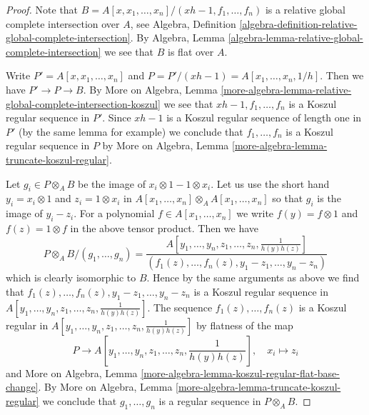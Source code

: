 \begin{proof}

Note that
$B = A[x, x_1, \ldots, x_n]/(xh - 1, f_1, \ldots, f_n)$
is a relative global complete intersection over $A$, see
Algebra, Definition
\ref{algebra-definition-relative-global-complete-intersection}.
By Algebra, Lemma \ref{algebra-lemma-relative-global-complete-intersection}
we see that $B$ is flat over $A$.

\medskip\noindent
Write $P' = A[x, x_1, \ldots, x_n]$ and
$P = P'/(xh - 1) = A[x_1, \ldots, x_n, 1/h]$.
Then we have $P' \to P \to B$.
By More on Algebra, Lemma
\ref{more-algebra-lemma-relative-global-complete-intersection-koszul}
we see that $xh - 1, f_1, \ldots, f_n$ is a Koszul regular sequence
in $P'$. Since $xh - 1$ is a Koszul regular sequence of length
one in $P'$ (by the same lemma for example) we conclude that
$f_1, \ldots, f_n$ is a Koszul regular sequence in $P$ by
More on Algebra, Lemma \ref{more-algebra-lemma-truncate-koszul-regular}.

\medskip\noindent
Let $g_i \in P \otimes_A B$ be the image of $x_i \otimes 1 - 1 \otimes x_i$.
Let us use the short hand $y_i = x_i \otimes 1$ and $z_i = 1 \otimes x_i$
in $A[x_1, \ldots, x_n] \otimes_A A[x_1, \ldots, x_n]$
so that $g_i$ is the image of $y_i - z_i$. For a polynomial
$f \in A[x_1, \ldots, x_n]$ we write $f(y) = f \otimes 1$
and $f(z) = 1 \otimes f$ in the above tensor product.
Then we have
$$
P \otimes_A B/(g_1, \ldots, g_n) =
\frac{A[y_1, \ldots, y_n, z_1, \ldots, z_n, \frac{1}{h(y)h(z)}]}
{(f_1(z), \ldots, f_n(z), y_1 - z_1, \ldots, y_n - z_n)}
$$
which is clearly isomorphic to $B$. Hence by the same arguments
as above we find that $f_1(z), \ldots, f_n(z), y_1 - z_1, \ldots, y_n - z_n$
is a Koszul regular sequence in
$A[y_1, \ldots, y_n, z_1, \ldots, z_n, \frac{1}{h(y)h(z)}]$.
The sequence $f_1(z), \ldots, f_n(z)$ is a Koszul regular in
$A[y_1, \ldots, y_n, z_1, \ldots, z_n, \frac{1}{h(y)h(z)}]$
by flatness of the map
$$
P \longrightarrow A[y_1, \ldots, y_n, z_1, \ldots, z_n,
\textstyle{\frac{1}{h(y)h(z)}}],\quad x_i \longmapsto z_i
$$
and More on Algebra, Lemma
\ref{more-algebra-lemma-koszul-regular-flat-base-change}.
By More on Algebra, Lemma \ref{more-algebra-lemma-truncate-koszul-regular}
we conclude that $g_1, \ldots, g_n$ is a regular sequence
in $P \otimes_A B$.


\end{proof}
